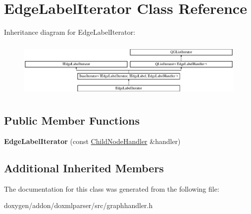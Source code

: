 \hypertarget{class_edge_label_iterator}{}\section{Edge\+Label\+Iterator Class Reference}
\label{class_edge_label_iterator}
Inheritance diagram for Edge\+Label\+Iterator\+:\begin{figure}[H]
\begin{center}
\leavevmode
\includegraphics[height=2.793018cm]{class_edge_label_iterator}
\end{center}
\end{figure}
\subsection*{Public Member Functions}
\begin{DoxyCompactItemize}
\item 
\mbox{\label{class_edge_label_iterator_a013e53e3e0175296a223b6b3443c386a}} 
{\bfseries Edge\+Label\+Iterator} (const \mbox{\hyperlink{class_child_node_handler}{Child\+Node\+Handler}} \&handler)
\end{DoxyCompactItemize}
\subsection*{Additional Inherited Members}


The documentation for this class was generated from the following file\+:\begin{DoxyCompactItemize}
\item 
doxygen/addon/doxmlparser/src/graphhandler.\+h\end{DoxyCompactItemize}
